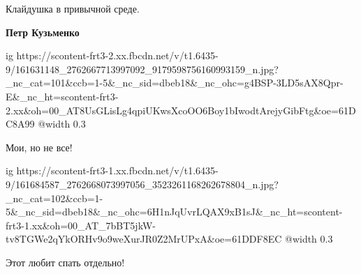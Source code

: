 
 
 
 
 

Клайдушка в привычной среде.

\textbf{Петр Кузьменко}

\ifcmt
  ig https://scontent-frt3-2.xx.fbcdn.net/v/t1.6435-9/161631148_2762667713997092_9179598756160993159_n.jpg?_nc_cat=101&ccb=1-5&_nc_sid=dbeb18&_nc_ohc=g4BSP-3LD5sAX8Qpr-E&_nc_ht=scontent-frt3-2.xx&oh=00_AT8UsGLisLg4qpiUKwsXcoOO6Boy1bIwodtArejyGibFtg&oe=61DC8A99
  @width 0.3
\fi

Мои, но не все!


\ifcmt
  ig https://scontent-frt3-1.xx.fbcdn.net/v/t1.6435-9/161684587_2762668073997056_3523261168262678804_n.jpg?_nc_cat=102&ccb=1-5&_nc_sid=dbeb18&_nc_ohc=6H1nJqUvrLQAX9xB1sJ&_nc_ht=scontent-frt3-1.xx&oh=00_AT_7bBT5jkW-tv8TGWe2qYkORHv9o9weXurJR0Z2MrUPxA&oe=61DDF8EC
  @width 0.3
\fi

Этот любит спать отдельно!
